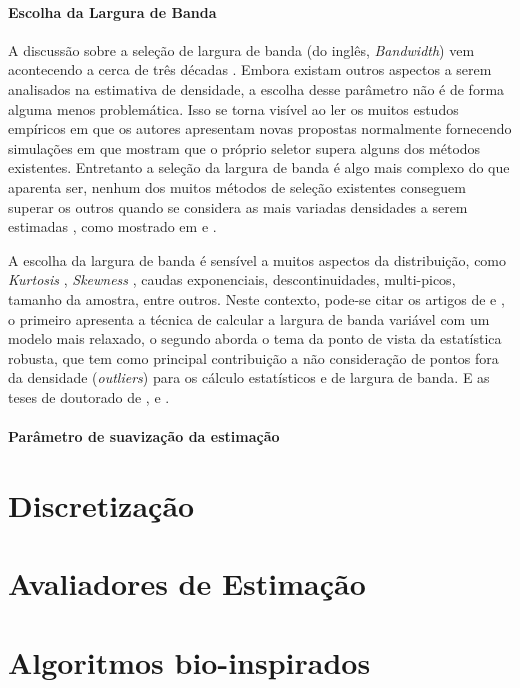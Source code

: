 \paragraph{Escolha da Largura de Banda}

A discussão sobre a seleção de largura de banda (do inglês, \textit{Bandwidth}) vem acontecendo a cerca de três décadas \cite{heidenreich2013bandwidth}. Embora existam outros aspectos a serem analisados na estimativa de densidade, a escolha desse parâmetro não é de forma alguma menos problemática. Isso se torna visível ao ler os muitos estudos empíricos em que os autores apresentam novas propostas normalmente fornecendo simulações em que mostram que o próprio seletor supera alguns dos métodos existentes. Entretanto a seleção da largura de banda é algo mais complexo do que aparenta ser, nenhum dos muitos métodos de seleção existentes conseguem superar os outros quando se considera as mais variadas densidades a serem estimadas , como mostrado em \cite{heidenreich2013bandwidth} e \cite{turlach1993bandwidth}.

A escolha da largura de banda é sensível a muitos aspectos da distribuição, como \textit{Kurtosis} \cite{decarlo1997meaning}, \textit{Skewness} \cite{mardia1970measures}, caudas exponenciais, descontinuidades, multi-picos, tamanho da amostra, entre outros. Neste contexto, pode-se citar os artigos de \cite{oyang2005data} e \cite{kim2012robust}, o primeiro apresenta a técnica de calcular a largura de banda variável com um modelo mais relaxado, o segundo aborda o tema da ponto de vista da estatística robusta, que tem como principal contribuição a não consideração de pontos fora da densidade (\textit{outliers}) para os cálculo estatísticos e de largura de banda. E as teses de doutorado de \cite{walter1998density}, \cite{duong2004bandwidth} e \cite{schindler2012bandwidth}.

\paragraph{Parâmetro de suavização da estimação}

\section{Discretização}


\section{Avaliadores de Estimação}


\section{Algoritmos bio-inspirados}


